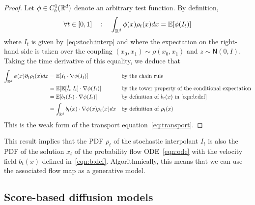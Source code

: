 \begin{proof}
	Let $\phi\in C^1_b(\mathbb{R}^d) $ denote an arbitrary test function.
	By definition,
	\begin{equation}
		\label{def:exp:I}
		\forall t \in [0,1]\quad : \quad \int_{\mathbb{R}^d} \phi(x) \rho_t(x) dx =  \mathbb{E}[ \phi(I_t)]
	\end{equation}
	where $I_t$ is given by~\eqref{eq:stoch:interp} and where the expectation on the right-hand side is taken over the coupling $(x_0, x_1) \sim \rho(x_0, x_1)$ and $z \sim \mathsf N(0, I)$.
	Taking the time derivative of this equality, we deduce that
	\begin{equation}
		\label{def:exp:diffI}
		\begin{aligned}
			\int_{\mathbb{R}^d} \phi(x) \partial_t \rho_t(x) dx & =  \mathbb{E}[\dot I_t \cdot \nabla \phi(I_t) ]                &  & \text{by the chain rule}                                    \\
			                                            & = \mathbb{E}[\mathbb{E}[\dot I_t|I_t] \cdot \nabla \phi(I_t) ]         &  & \text{by the tower property of the conditional expectation} \\
			                                            & = \mathbb{E}[b_t(I_t) \cdot \nabla \phi(I_t) ]                 &  & \text{by definition of $b_t(x)$ in \eqref{eqn:b:def}}
			\\
			                                            & = \int_{\mathbb{R}^d} b_t(x) \cdot \nabla \phi(x) \rho_t(x) dx &  & \text{by definition of $\rho_t(x)$}
		\end{aligned}
	\end{equation}
	This is the weak form of the transport equation~\eqref{eq:transport}.
\end{proof}


This result implies that the PDF $\rho_t$ of the stochastic interpolant $I_t$  is also the PDF of the solution $x_t$ of the probability flow ODE~\eqref{eqn:ode} with the velocity field $b_t(x)$ defined in~\eqref{eqn:b:def}.
%
Algorithmically, this means that we can use the associated flow map as a generative model.

\subsection{Score-based diffusion models}
\label{sec:sbdm}

